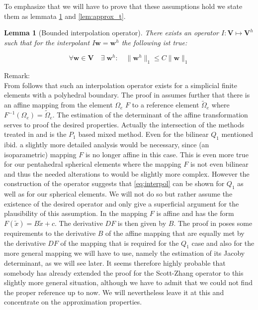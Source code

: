 \documentclass[times]{fldauth}
\newcommand{\mb}{\mathbf}
\newtheorem{lemma}{Lemma}[section]
\begin{document}
To emphasize that we will have to prove that these assumptions hold we state them as lemmata \ref{lem:bio} and \ref{lem:approx_t}. 
\\
\begin{lemma}[Bounded interpolation operator]
\label{lem:bio}
There exists an operator $I: \mb V \mapsto \mb V^h  $ such that for the interpolant $I \mb w = \mb w^h$ the following ist true:

\begin{equation}
\label{eq:interpol}
\forall \mb w \in \mb V \quad \exists \; \mb w^h :\quad
\| \mb  w^h\|_1 \le C \|\mb w\|_1
\end{equation}
\end{lemma}
Remark:\\
From  \cite[Lemma~4.1]{scott1990finite} follows that  such an interpolation operator exists for a simplicial finite elements with a polyhedral boundary.
The proof in \cite{scott1990finite} assumes further that there is an affine mapping from the element $\Omega_e$ 
$F$ to a reference element $\tilde \Omega_e$ where $F^{-1}(\Omega_e)=\tilde \Omega_e$. 
The estimation of the determinant of the affine transformation serves to proof the desired properties. 
Actually the intersection of the methods treated in \cite{bochev2007stabilization} and \cite{scott1990finite} is the $P_1$ based mixed method. Even for the bilinear $Q_1$ mentioned ibid. a slightly more detailed analysis would be necessary, since (an isoparametric) mapping $F$ is no longer affine in this case.
This is even more true for our pentahedral spherical elements where the mapping $F$ is not even bilinear and thus the needed alterations to \cite{scott1990finite} would be slightly more complex.
However the construction of the operator suggests that \eqref{eq:interpol} can be shown for $Q_1$ as well as for  our spherical elements. We will not do so but rather assume the existence of the desired operator and only give a superficial argument for the plausibility of this assumption.
In \cite{scott1990finite} the mapping $F$ is affine and has the form $F(\tilde{x})=B \tilde{x} +c$. The derivative $DF$ is then given by $B$. The proof in  \cite{scott1990finite} poses some requirements to the derivative $B$ of the affine mapping that are equally met by the derivative $DF$ of the mapping that is required for the $Q_1$ case and also for the more general mapping we will have to use, namely the estimation of its Jacoby determinant, as we will see later. 
It seems therefore highly probable that somebody has already extended the proof for the Scott-Zhang operator to this slightly more general situation, although we have to admit that we could not find the proper reference up to now. We will nevertheless leave it at this and concentrate on the approximation properties.   
\end{document}

